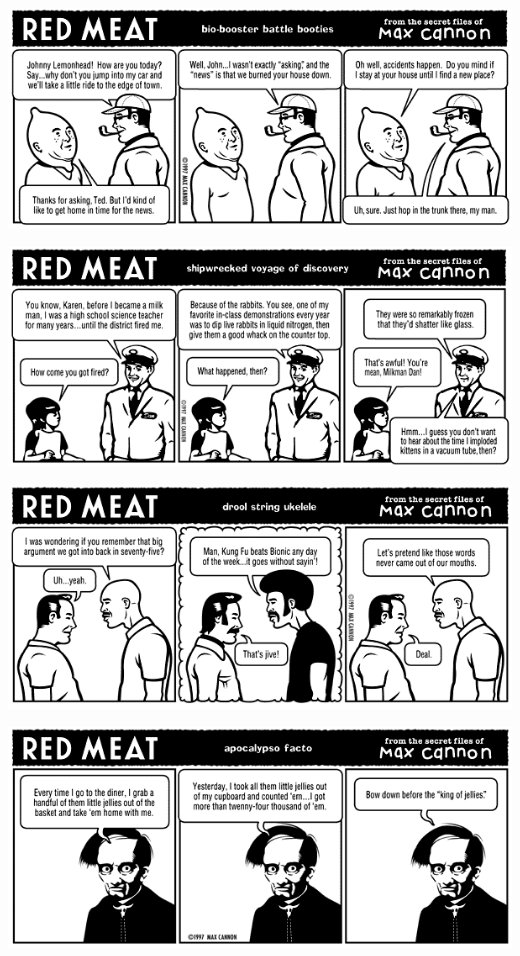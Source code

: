 \documentclass[a4paper,twoside,11pt]{article}
\begin{document}
\includegraphics[width=\textwidth]{redmeat_1997-04-14.png}



\includegraphics[width=\textwidth]{redmeat_1997-04-21.png}



\includegraphics[width=\textwidth]{redmeat_1997-04-28.png}



\includegraphics[width=\textwidth]{redmeat_1997-05-05.png}
\end{document}

